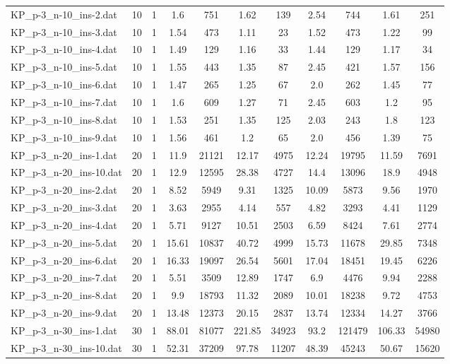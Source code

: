 \begin{table}[!ht]
\begin{tabular}{lcccccccccc}
KP\_p-3\_n-10\_ins-2.dat & 10 & 1 & 1.6 & 751 & 1.62 & 139 & 2.54 & 744 & 1.61 & 251 \\
KP\_p-3\_n-10\_ins-3.dat & 10 & 1 & 1.54 & 473 & 1.11 & 23 & 1.52 & 473 & 1.22 & 99 \\
KP\_p-3\_n-10\_ins-4.dat & 10 & 1 & 1.49 & 129 & 1.16 & 33 & 1.44 & 129 & 1.17 & 34 \\
KP\_p-3\_n-10\_ins-5.dat & 10 & 1 & 1.55 & 443 & 1.35 & 87 & 2.45 & 421 & 1.57 & 156 \\
KP\_p-3\_n-10\_ins-6.dat & 10 & 1 & 1.47 & 265 & 1.25 & 67 & 2.0 & 262 & 1.45 & 77 \\
KP\_p-3\_n-10\_ins-7.dat & 10 & 1 & 1.6 & 609 & 1.27 & 71 & 2.45 & 603 & 1.2 & 95 \\
KP\_p-3\_n-10\_ins-8.dat & 10 & 1 & 1.53 & 251 & 1.35 & 125 & 2.03 & 243 & 1.8 & 123 \\
KP\_p-3\_n-10\_ins-9.dat & 10 & 1 & 1.56 & 461 & 1.2 & 65 & 2.0 & 456 & 1.39 & 75 \\
KP\_p-3\_n-20\_ins-1.dat & 20 & 1 & 11.9 & 21121 & 12.17 & 4975 & 12.24 & 19795 & 11.59 & 7691 \\
KP\_p-3\_n-20\_ins-10.dat & 20 & 1 & 12.9 & 12595 & 28.38 & 4727 & 14.4 & 13096 & 18.9 & 4948 \\
KP\_p-3\_n-20\_ins-2.dat & 20 & 1 & 8.52 & 5949 & 9.31 & 1325 & 10.09 & 5873 & 9.56 & 1970 \\
KP\_p-3\_n-20\_ins-3.dat & 20 & 1 & 3.63 & 2955 & 4.14 & 557 & 4.82 & 3293 & 4.41 & 1129 \\
KP\_p-3\_n-20\_ins-4.dat & 20 & 1 & 5.71 & 9127 & 10.51 & 2503 & 6.59 & 8424 & 7.61 & 2774 \\
KP\_p-3\_n-20\_ins-5.dat & 20 & 1 & 15.61 & 10837 & 40.72 & 4999 & 15.73 & 11678 & 29.85 & 7348 \\
KP\_p-3\_n-20\_ins-6.dat & 20 & 1 & 16.33 & 19097 & 26.54 & 5601 & 17.04 & 18451 & 19.45 & 6226 \\
KP\_p-3\_n-20\_ins-7.dat & 20 & 1 & 5.51 & 3509 & 12.89 & 1747 & 6.9 & 4476 & 9.94 & 2288 \\
KP\_p-3\_n-20\_ins-8.dat & 20 & 1 & 9.9 & 18793 & 11.32 & 2089 & 10.01 & 18238 & 9.72 & 4753 \\
KP\_p-3\_n-20\_ins-9.dat & 20 & 1 & 13.48 & 12373 & 20.15 & 2837 & 13.74 & 12334 & 14.27 & 3766 \\
KP\_p-3\_n-30\_ins-1.dat & 30 & 1 & 88.01 & 81077 & 221.85 & 34923 & 93.2 & 121479 & 106.33 & 54980 \\
KP\_p-3\_n-30\_ins-10.dat & 30 & 1 & 52.31 & 37209 & 97.78 & 11207 & 48.39 & 45243 & 50.67 & 15620 \\

\end{tabular}
\end{table}
